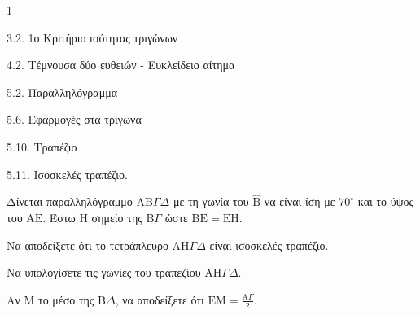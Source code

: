 \begin{ylh}{1}
    \item 3.2. 1ο Κριτήριο ισότητας τριγώνων
    \item 4.2. Τέμνουσα δύο ευθειών - Ευκλείδειο αίτημα
    \item 5.2. Παραλληλόγραμμα
    \item 5.6. Εφαρμογές στα τρίγωνα
    \item 5.10. Τραπέζιο
    \item 5.11. Ισοσκελές τραπέζιο.
\end{ylh}
Δίνεται παραλληλόγραμμο $\mathrm{A}\mathrm{B}\Gamma\Delta$ με τη γωνία του $\hat{\mathrm{B}}$ να είναι ίση με $70^\circ$ και το ύψος του $\mathrm{A}\mathrm{E}$. Έστω $\mathrm{H}$ σημείο της $\mathrm{B}\Gamma$ ώστε $\mathrm{B}\mathrm{E} = \mathrm{E}\mathrm{H}$.
\begin{alist}
    \item Να αποδείξετε ότι το τετράπλευρο $\mathrm{A}\mathrm{H}\Gamma\Delta$ είναι ισοσκελές τραπέζιο. 
    \item Να υπολογίσετε τις γωνίες του τραπεζίου $\mathrm{A}\mathrm{H}\Gamma\Delta$. 
    \item Αν $\mathrm{M}$ το μέσο της $\mathrm{B}\Delta$, να αποδείξετε ότι $\mathrm{E}\mathrm{M} = \frac{\mathrm{A}\Gamma}{2}$. 
\end{alist}

